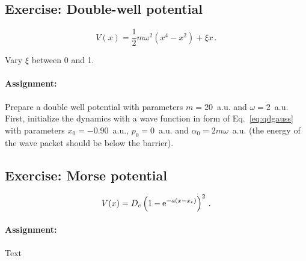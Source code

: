 \subsection*{Exercise: Double-well potential}

\begin{equation*}
    V(x) = \frac{1}{2}m\omega^2(x^4 - x^2) + \xi x \, .
\end{equation*}

Vary $\xi$ between 0 and 1.

\paragraph{Assignment:} Prepare a double well potential with parameters $m=20$~a.u. and $\omega=2$~a.u. First, initialize the dynamics with a wave function in form of Eq.~\eqref{eq:qdgauss} with parameters $x_0=-0.90$~a.u., $p_0=0$~a.u. and $\alpha_0 = 2m\omega$~a.u. (the energy of the wave packet should be below the barrier). 


\subsection*{Exercise: Morse potential}

\begin{equation*}
    V(x) = D_e \left(1 - \mathrm{e}^{-a(x-x_e)}\right)^2 \, .
\end{equation*}

\paragraph{Assignment:} Text